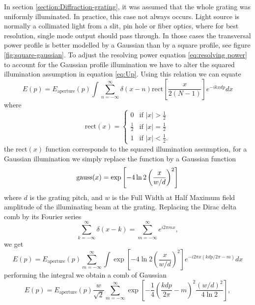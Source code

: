 \documentclass[12pt,twoside,english]{book}
\renewcommand{\~}{\perispomeni}%
\numberwithin{equation}{section}
\numberwithin{figure}{section}
\begin{document}
In section \ref{section:Diffraction-grating}, it was assumed that the whole grating was uniformly illuminated. In practice, this case not always occurs. Light source is normally a collimated light from a slit, pin hole or fiber optics, where for best resolution, single mode output should pass through. In those cases the transversal power profile is better modelled by a Gaussian than by a square profile, see figure \ref{fig:square-gaussian}. To adjust the resolving power equation \ref{eq:resolving power} to account for the Gaussian profile illumination we have to alter the squared illumination assumption in equation \ref{eq:Up}. Using this relation we can equate 
\begin{equation}
E\left(p\right)=E_{\text{aperture}}\left(p\right)\int\sum_{n=-\infty}^{\infty}\delta\left(x-n\right)\text{rect}\left[\frac{x}{2\left(N-1\right)}\right]e^{-ikxdp}dx\end{equation}
where
\begin{equation}
\text{rect}\left(x\right)=\begin{cases}
0 & \mbox{if }\left|x\right|>\frac{1}{2}\\
\frac{1}{2} & \mbox{if }\left|x\right|=\frac{1}{2}\\
1 & \mbox{if }\left|x\right|<\frac{1}{2}.\end{cases}\end{equation}
the rect$\left(x\right)$ function corresponds to the squared illumination assumption, for a Gaussian illumination we simply replace the function by a Gaussian function
\begin{equation}
\text{gauss}\mbox{\ensuremath{\left(x\right)}}=\exp\left[-4\ln2\left(\frac{x}{w/d}\right)^{2}\right]\end{equation}
where $d$ is the grating pitch, and $w$ is the Full Width at Half Maximum field amplitude of the illuminating beam at the grating. Replacing the Dirac delta comb by its Fourier series 
\begin{equation}
\sum_{k=-\infty}^{\infty}\delta\left(x-k\right)=\sum_{m=-\infty}^{\infty}e^{i2\pi mx},\end{equation}
we get
\begin{equation}
E\left(p\right)=E_{\text{aperture}}\left(p\right)\sum_{m=-\infty}^{\infty}\int\exp\left[-4\ln2\left(\frac{x}{w/d}\right)^{2}\right]e^{-i2\pi x\left(kdp/2\pi-m\right)}dx\end{equation}
performing the integral we obtain a comb of Gaussian 
\begin{equation}
E\left(p\right)=E_{\text{aperture}}\left(p\right)\frac{w}{\sqrt{2}}\sum_{m=-\infty}^{\infty}\exp\left[-\frac{1}{4}\left(\frac{kdp}{2\pi}-m\right)^{2}\frac{\left(w/d\right)^{2}}{4\ln2}\right],
\label{eq:gaussian comb}
\end{equation}
\end{document}

